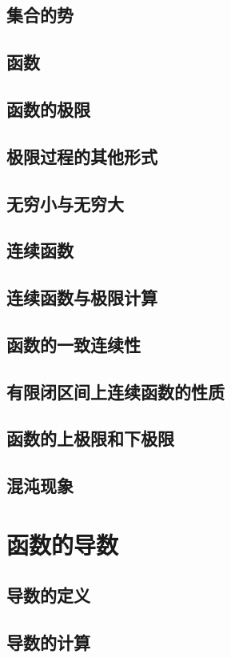 \documentclass[a4paper, 11pt]{ctexbook}
\begin{document}
        \section{集合的势}
        \section{函数}
        \section{函数的极限}
        \section{极限过程的其他形式}
        \section{无穷小与无穷大}
        \section{连续函数}
        \section{连续函数与极限计算}
        \section{函数的一致连续性}
        \section{有限闭区间上连续函数的性质}
        \section{函数的上极限和下极限}
        \section{混沌现象}
    \chapter{函数的导数}
        \section{导数的定义}
        \section{导数的计算}
\end{document}

